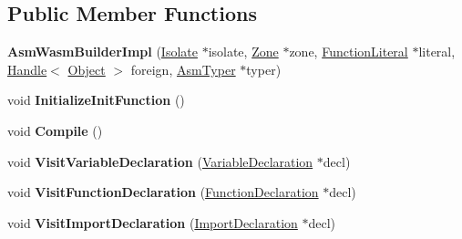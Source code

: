 \subsection*{Public Member Functions}
\begin{DoxyCompactItemize}
\item 
{\bfseries Asm\+Wasm\+Builder\+Impl} (\hyperlink{classv8_1_1internal_1_1_isolate}{Isolate} $\ast$isolate, \hyperlink{classv8_1_1internal_1_1_zone}{Zone} $\ast$zone, \hyperlink{classv8_1_1internal_1_1_function_literal}{Function\+Literal} $\ast$literal, \hyperlink{classv8_1_1internal_1_1_handle}{Handle}$<$ \hyperlink{classv8_1_1internal_1_1_object}{Object} $>$ foreign, \hyperlink{classv8_1_1internal_1_1_asm_typer}{Asm\+Typer} $\ast$typer)\hypertarget{classv8_1_1internal_1_1wasm_1_1_asm_wasm_builder_impl_ae2200d7ed9e24034e88717bead170686}{}\label{classv8_1_1internal_1_1wasm_1_1_asm_wasm_builder_impl_ae2200d7ed9e24034e88717bead170686}

\item 
void {\bfseries Initialize\+Init\+Function} ()\hypertarget{classv8_1_1internal_1_1wasm_1_1_asm_wasm_builder_impl_ac192b79608cf94e36421a2f7668153d9}{}\label{classv8_1_1internal_1_1wasm_1_1_asm_wasm_builder_impl_ac192b79608cf94e36421a2f7668153d9}

\item 
void {\bfseries Compile} ()\hypertarget{classv8_1_1internal_1_1wasm_1_1_asm_wasm_builder_impl_a8bab6ccaf5fe5559a55bb08e92a5c554}{}\label{classv8_1_1internal_1_1wasm_1_1_asm_wasm_builder_impl_a8bab6ccaf5fe5559a55bb08e92a5c554}

\item 
void {\bfseries Visit\+Variable\+Declaration} (\hyperlink{classv8_1_1internal_1_1_variable_declaration}{Variable\+Declaration} $\ast$decl)\hypertarget{classv8_1_1internal_1_1wasm_1_1_asm_wasm_builder_impl_ae4bac98194004fd844966758b2a89a9d}{}\label{classv8_1_1internal_1_1wasm_1_1_asm_wasm_builder_impl_ae4bac98194004fd844966758b2a89a9d}

\item 
void {\bfseries Visit\+Function\+Declaration} (\hyperlink{classv8_1_1internal_1_1_function_declaration}{Function\+Declaration} $\ast$decl)\hypertarget{classv8_1_1internal_1_1wasm_1_1_asm_wasm_builder_impl_a694e7149b280db094d055d956009bd91}{}\label{classv8_1_1internal_1_1wasm_1_1_asm_wasm_builder_impl_a694e7149b280db094d055d956009bd91}

\item 
void {\bfseries Visit\+Import\+Declaration} (\hyperlink{classv8_1_1internal_1_1_import_declaration}{Import\+Declaration} $\ast$decl)\hypertarget{classv8_1_1internal_1_1wasm_1_1_asm_wasm_builder_impl_afc6f06bff416acdccf9874f93f20e397}{}\label{classv8_1_1internal_1_1wasm_1_1_asm_wasm_builder_impl_afc6f06bff416acdccf9874f93f20e397}


\end{DoxyCompactItemize}
